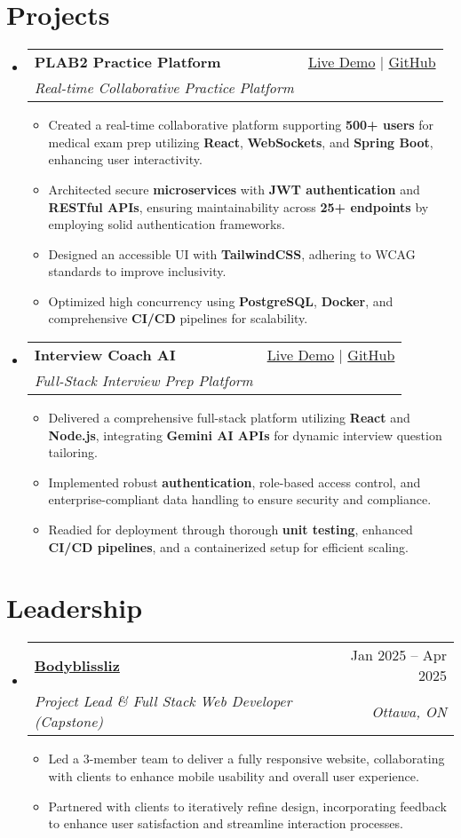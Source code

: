\documentclass[letterpaper,11pt]{article}
\makeatletter
\newcommand{\resumeItem}[1]{\item\small{#1 \vspace{-2pt}}}
\newcommand{\resumeSubheading}[4]{
  \vspace{-1pt}\item
    \begin{tabular*}{0.97\textwidth}[t]{l@{\extracolsep{\fill}}r}
      \textbf{#1} & #2 \\
      \textit{\small#3} & \textit{\small #4} \\
    \end{tabular*}\vspace{-5pt}
}
\newcommand{\resumeSubHeadingListStart}{\begin{itemize}[leftmargin=*]}
\newcommand{\resumeSubHeadingListEnd}{\end{itemize}}
\newcommand{\resumeItemListStart}{\begin{itemize}}
\newcommand{\resumeItemListEnd}{\end{itemize}\vspace{-5pt}}
\makeatother
\begin{document}
\section{Projects}
  \resumeSubHeadingListStart
    \resumeSubheading
      {\textbf{PLAB2 Practice Platform}}{\href{https://plab2practice.com?utm_source=eunasolutions\&utm_medium=resume\&utm_campaign=job_application}{Live Demo} | \href{https://github.com/altansaid/plab2projectnew}{GitHub}}
      {Real-time Collaborative Practice Platform}{}
      \resumeItemListStart
        \resumeItem{Created a real-time collaborative platform supporting \textbf{500+ users} for medical exam prep utilizing \textbf{React}, \textbf{WebSockets}, and \textbf{Spring Boot}, enhancing user interactivity.}
        \resumeItem{Architected secure \textbf{microservices} with \textbf{JWT authentication} and \textbf{RESTful APIs}, ensuring maintainability across \textbf{25+ endpoints} by employing solid authentication frameworks.}
        \resumeItem{Designed an accessible UI with \textbf{TailwindCSS}, adhering to WCAG standards to improve inclusivity.}
        \resumeItem{Optimized high concurrency using \textbf{PostgreSQL}, \textbf{Docker}, and comprehensive \textbf{CI/CD} pipelines for scalability.}
      \resumeItemListEnd

    \resumeSubheading
      {\textbf{Interview Coach AI}}{\href{https://interviewcoach-ai.vercel.app}{Live Demo} | \href{https://github.com/altansaid/interviewcoach-ai}{GitHub}}
      {Full-Stack Interview Prep Platform}{}
      \resumeItemListStart
        \resumeItem{Delivered a comprehensive full-stack platform utilizing \textbf{React} and \textbf{Node.js}, integrating \textbf{Gemini AI APIs} for dynamic interview question tailoring.}
        \resumeItem{Implemented robust \textbf{authentication}, role-based access control, and enterprise-compliant data handling to ensure security and compliance.}
        \resumeItem{Readied for deployment through thorough \textbf{unit testing}, enhanced \textbf{CI/CD pipelines}, and a containerized setup for efficient scaling.}
      \resumeItemListEnd
  \resumeSubHeadingListEnd

\section{Leadership}
  \resumeSubHeadingListStart
    \resumeSubheading
      {\href{https://www.bodyblissliz.com}{Bodyblissliz}}{Jan 2025 -- Apr 2025}
      {Project Lead \& Full Stack Web Developer (Capstone)}{Ottawa, ON}
      \resumeItemListStart
        \resumeItem{Led a 3-member team to deliver a fully responsive website, collaborating with clients to enhance mobile usability and overall user experience.}
        \resumeItem{Partnered with clients to iteratively refine design, incorporating feedback to enhance user satisfaction and streamline interaction processes.}
      \resumeItemListEnd
  \resumeSubHeadingListEnd
\end{document}
